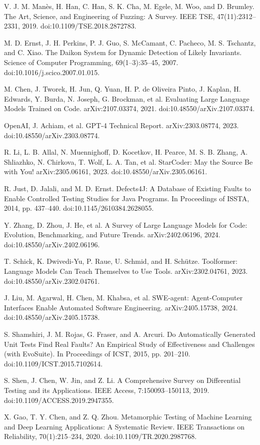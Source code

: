 \documentclass[10pt,twocolumn]{article}
\begin{document}
\begin{thebibliography}{99}
V. J. M. Man\`es, H. Han, C. Han, S. K. Cha, M. Egele, M. Woo, and D. Brumley.
The Art, Science, and Engineering of Fuzzing: A Survey.
IEEE TSE, 47(11):2312--2331, 2019. doi:10.1109/TSE.2018.2872783.

M. D. Ernst, J. H. Perkins, P. J. Guo, S. McCamant, C. Pacheco, M. S. Tschantz, and C. Xiao.
The Daikon System for Dynamic Detection of Likely Invariants.
Science of Computer Programming, 69(1--3):35--45, 2007. doi:10.1016/j.scico.2007.01.015.

M. Chen, J. Tworek, H. Jun, Q. Yuan, H. P. de Oliveira Pinto, J. Kaplan, H. Edwards, Y. Burda, N. Joseph, G. Brockman, et al.
Evaluating Large Language Models Trained on Code.
arXiv:2107.03374, 2021. doi:10.48550/arXiv.2107.03374.

OpenAI, J. Achiam, et al.
GPT-4 Technical Report.
arXiv:2303.08774, 2023. doi:10.48550/arXiv.2303.08774.

R. Li, L. B. Allal, N. Muennighoff, D. Kocetkov, H. Pearce, M. S. B. Zhang, A. Shliazhko, N. Chirkova, T. Wolf, L. A. Tan, et al.
StarCoder: May the Source Be with You!
arXiv:2305.06161, 2023. doi:10.48550/arXiv.2305.06161.

R. Just, D. Jalali, and M. D. Ernst.
Defects4J: A Database of Existing Faults to Enable Controlled Testing Studies for Java Programs.
In Proceedings of ISSTA, 2014, pp. 437--440. doi:10.1145/2610384.2628055.

Y. Zhang, D. Zhou, J. He, et al.
A Survey of Large Language Models for Code: Evolution, Benchmarking, and Future Trends.
arXiv:2402.06196, 2024. doi:10.48550/arXiv.2402.06196.

T. Schick, K. Dwivedi-Yu, P. Raue, U. Schmid, and H. Sch{\"u}tze.
Toolformer: Language Models Can Teach Themselves to Use Tools.
arXiv:2302.04761, 2023. doi:10.48550/arXiv.2302.04761.

J. Liu, M. Agarwal, H. Chen, M. Khabsa, et al.
SWE-agent: Agent-Computer Interfaces Enable Automated Software Engineering.
arXiv:2405.15738, 2024. doi:10.48550/arXiv.2405.15738.

S. Shamshiri, J. M. Rojas, G. Fraser, and A. Arcuri.
Do Automatically Generated Unit Tests Find Real Faults? An Empirical Study of Effectiveness and Challenges (with EvoSuite).
In Proceedings of ICST, 2015, pp. 201--210. doi:10.1109/ICST.2015.7102614.

S. Shen, J. Chen, W. Jin, and Z. Li.
A Comprehensive Survey on Differential Testing and its Applications.
IEEE Access, 7:150093--150113, 2019. doi:10.1109/ACCESS.2019.2947355.

X. Gao, T. Y. Chen, and Z. Q. Zhou.
Metamorphic Testing of Machine Learning and Deep Learning Applications: A Systematic Review.
IEEE Transactions on Reliability, 70(1):215--234, 2020. doi:10.1109/TR.2020.2987768.

\end{thebibliography}
\end{document}
